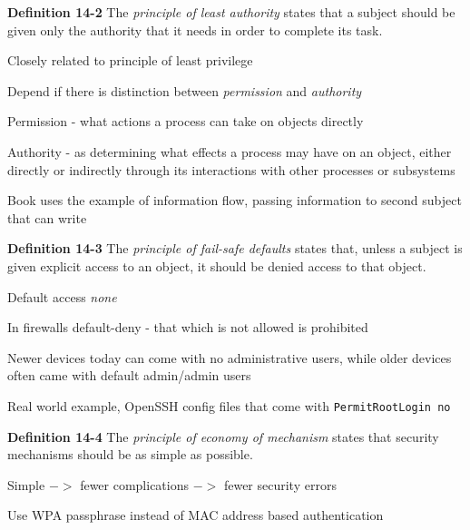 \documentclass[Screen16to9,17pt]{foils}
\begin{document}

\begin{list1}
\item
\item {\bf Definition 14-2} The \emph{principle of least authority} states that a subject should be given only the authority that it needs in order to complete its task.
\item Closely related to principle of least privilege
\item Depend if there is distinction between \emph{permission} and \emph{authority}
\item Permission - what actions a process can take on objects directly
\item Authority - as determining what effects a process may have on an object, either directly or indirectly through its interactions with other processes or subsystems
\item Book uses the example of information flow, passing information to second subject that can write
\end{list1}



\begin{list1}
\item {\bf Definition 14-3} The \emph{principle of fail-safe defaults} states that, unless a subject is given explicit access to an object, it should be denied access to that object.
\item Default access \emph{none}
\item In firewalls default-deny - that which is not allowed is prohibited
\item Newer devices today can come with no administrative users, while older devices often came with default admin/admin users
\item Real world example, OpenSSH config files that come with \verb+PermitRootLogin no+
\end{list1}



\begin{list1}
\item {\bf Definition 14-4} The \emph{principle of economy of mechanism} states that security mechanisms should be as simple as possible.
\item Simple $->$ fewer complications $->$ fewer security errors
\item Use WPA passphrase instead of MAC address based authentication
\item
\end{list1}
\end{document}
